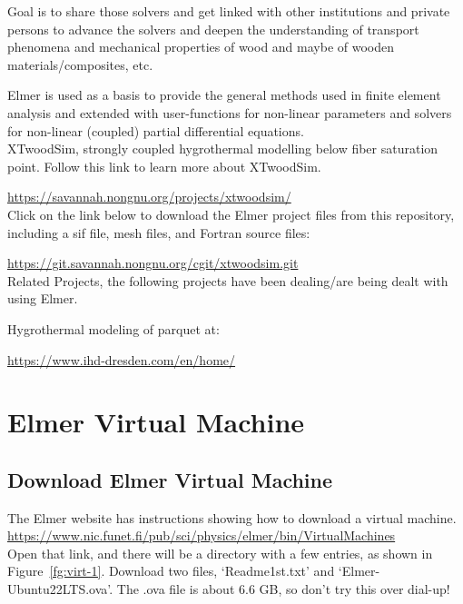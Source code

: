 Goal is to share those solvers and get linked with other institutions and private persons to advance the solvers and deepen the understanding of transport phenomena and mechanical properties of wood and maybe of wooden materials/composites, etc.

Elmer is used as a basis to provide the general methods used in finite element analysis and extended with user-functions for non-linear parameters and solvers for non-linear (coupled) partial differential equations.\\

\noindent XTwoodSim, strongly coupled hygrothermal modelling below fiber saturation point.  Follow this link to learn more about XTwoodSim.

    \url{https://savannah.nongnu.org/projects/xtwoodsim/}\\

Click on the link below to download the Elmer project files from this repository, including a sif file, mesh files, and Fortran source files:

\url{https://git.savannah.nongnu.org/cgit/xtwoodsim.git}\\

\noindent Related Projects, the following projects have been dealing/are being dealt with using Elmer.

    Hygrothermal modeling of parquet at:

\url{https://www.ihd-dresden.com/en/home/}


\chapter{Elmer Virtual Machine}

\section{Download Elmer Virtual Machine}

The Elmer website has instructions showing how to download a virtual machine.\\

 \url{https://www.nic.funet.fi/pub/sci/physics/elmer/bin/VirtualMachines}\\

Open that link, and there will be a directory with a few entries, as shown in Figure~\ref{fg:virt-1}.  Download two files, `Readme1st.txt' and  `Elmer-Ubuntu22LTS.ova'.  The .ova file is about 6.6 GB, so don't try this over dial-up!\\

